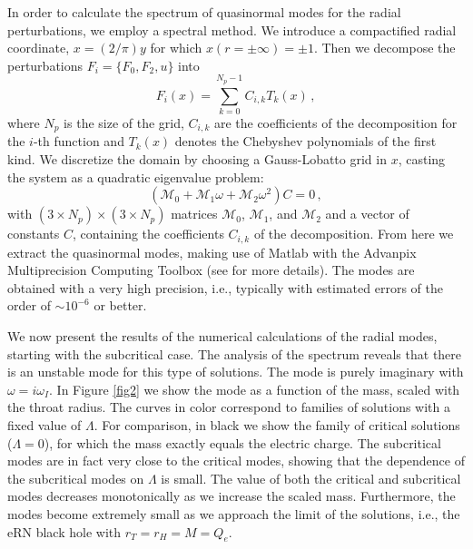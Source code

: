 \documentclass[floats,floatfix,showpacs,amssymb,prd,superscriptaddress,nofootinbib,nolongbibliography,reprint]{revtex4-2}
\newcommand\prlsec[1]{\vspace{2mm}\noindent {\textbf{  \textit{#1}}}}
\begin{document}
In order to calculate the spectrum of quasinormal modes for the radial perturbations, we employ a spectral method. 
We introduce a compactified radial coordinate, $x= (2/\pi) y$ for which $x(r=\pm\infty)=\pm1$.
%
Then we decompose the perturbations 
$F_i=\{F_0,F_2,u\}$
into 
%
\begin{equation}\label{spectral_decomp}
    F_i(x)=\sum_{k=0}^{N_p-1}C_{i,k}T_k(x) \, ,
\end{equation}
where $N_p$ is the size of the grid, 
$C_{i,k}$ are the coefficients of the decomposition for the $i$-th function and $T_k(x)$ denotes the Chebyshev polynomials of the first kind.
We discretize the domain by choosing a Gauss-Lobatto grid in $x$, casting the system as a quadratic eigenvalue problem:
\begin{equation}
    \left(\mathcal{M}_0+\mathcal{M}_1\omega+\mathcal{M}_2\omega^2\right)C=0 \, ,
\end{equation}
with $(3\times N_p) \times (3\times N_p)$ matrices $\mathcal{M}_0$, $\mathcal{M}_1$, and $\mathcal{M}_2$
and a vector of constants $C$, containing the coefficients $C_{i,k}$ of the decomposition.
From here we extract the quasinormal modes, making use of
Matlab with the Advanpix Multiprecision Computing Toolbox \cite{Advanpix} (see \cite{Blazquez-Salcedo:2023hwg,Khoo:2024yeh,Blazquez-Salcedo:2024oek, 
Blazquez-Salcedo:2024dur,Khoo:2024agm} for more details). 
The modes are obtained with a very high precision, i.e., typically with estimated errors of the order of  $\sim 10^{-6}$ or better. 



\prlsec{Results.}
%
We now present the results of the numerical calculations of the radial modes, starting with the subcritical case. The analysis of the spectrum reveals that there is an unstable mode for this type of solutions. The mode is purely imaginary with $\omega=i\omega_I$. In Figure \ref{fig2} we show the mode as a function of the mass, scaled with the throat radius. The curves in color correspond to families of solutions with a fixed value of $\Lambda$.
%
For comparison,
in black we show the family of critical solutions ($\Lambda=0$), for which the mass exactly equals  the electric charge. The subcritical 
modes are in fact very close to the critical 
modes,
showing that the dependence of the {subcritical} modes on $\Lambda$ is small.
The value of both the critical and subcritical modes decreases monotonically as we increase 
the scaled mass. 
Furthermore, the modes become extremely small as we approach the limit of the solutions, i.e., the eRN black hole with $r_T=r_H=M=Q_e$. %
\end{document}

